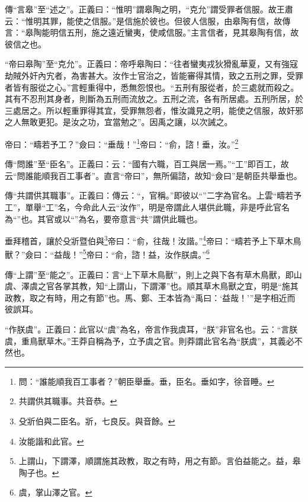 {\noindent\zhuan{}\fzbyks 傳“言皋”至“述之”。正義曰：“惟明”謂皋陶之明，“克允”謂受罪者信服。故王肅云：“惟明其罪，能使之信服。”是信施於彼也。但彼人信服，由皋陶有信，故傳言：“皋陶能明信五刑，施之遠近蠻夷，使咸信服。”主言信者，見其皋陶有信，故彼信之也。 \par}

{\noindent\shu{}\fzkt “帝曰皋陶”至“克允”。正義曰：帝呼皋陶曰：“往者蠻夷戎狄猾亂華夏，又有強寇劫賊外奸內宄者，為害甚大。汝作士官治之，皆能審得其情，致之五刑之罪，受罪者皆有服從之心。”言輕重得中，悉無怨恨也。“五刑有服從者，於三處就而殺之。其有不忍刑其身者，則斷為五刑而流放之。五刑之流，各有所居處。五刑所居，於三處居之。所以輕重罪得其宜，受罪無怨者，惟汝識見之明，能使之信服，故奸邪之人無敢更犯。是汝之功，宜當勉之”。因禹之讓，以次誡之。 \par}

帝曰：“疇若予工？”僉曰：“垂哉！”\footnote{問：“誰能順我百工事者？”朝臣舉垂。垂，臣名。垂如字，徐音睡。}帝曰：“俞，諮！垂，汝。”\footnote{共謂供其職事。共音恭。}

{\noindent\zhuan{}\fzbyks 傳“問誰”至“臣名”。正義曰：云：“國有六職，百工與居一焉。”“工”即百工，故云“問誰能順我百工事者”。直言“帝曰”，無所偏諮，故知“僉曰”是朝臣共舉垂也。 \par}

{\noindent\zhuan{}\fzbyks 傳“共謂供其職事”。正義曰：傳云：“，官稱。”即彼以“”二字為官名。上雲“疇若予工”，單舉“工”名，今命此人云“汝作”，明是帝謂此人堪供此職，非是呼此官名為“”也。其官或以“”為名，要帝意言“共”謂供此職也。 \par}

垂拜稽首，讓於殳斨暨伯與\footnote{殳斨伯與二臣名。斨，七良反。與音餘。}帝曰：“俞，往哉！汝諧。”\footnote{汝能諧和此官。}帝曰：“疇若予上下草木鳥獸？”僉曰：“益哉！”\footnote{上謂山，下謂澤，順謂施其政教，取之有時，用之有節。言伯益能之。益，皋陶子也。}帝曰：“俞，諮！益，汝作朕虞。”\footnote{虞，掌山澤之官。}

{\noindent\zhuan{}\fzbyks 傳“上謂”至“能之”。正義曰：言“上下草木鳥獸”，則上之與下各有草木鳥獸，即山虞、澤虞之官各掌其教，知“上謂山，下謂澤”也。順其草木鳥獸之宜，明是“施其政教，取之有時，用之有節”也。馬、鄭、王本皆為“禹曰：‘益哉！’”是字相近而彼誤耳。 \par}

{\noindent\zhuan{}\fzbyks “作朕虞”。正義曰：此官以“虞”為名，帝言作我虞耳，“朕”非官名也。云：“言朕虞，重鳥獸草木。”王莽自稱為予，立予虞之官。則莽謂此官名為“朕虞”，其義必不然也。 \par}

